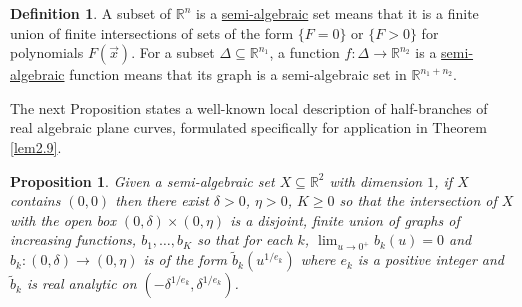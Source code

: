 \documentclass[12pt]{amsart}
\newtheorem{prop}[thm]{Proposition}
\theoremstyle{definition}
\newtheorem{defn}[thm]{Definition}
\theoremstyle{remark}
\numberwithin{equation}{section}
\newcommand{\re}{\mathbb{R}}
\begin{document}
\begin{defn}\label{def4.2}
  A subset of $\re^{n}$ is a {\underline{semi-algebraic}} set means that it is a finite union of finite intersections of sets of the form $\{F=0\}$ or $\{F>0\}$ for polynomials $F(\vec x)$.  For a subset $\Delta\subseteq\re^{n_1}$, a function $f:\Delta\to\re^{n_2}$ is a {\underline{semi-algebraic}} function means that its graph is a semi-algebraic set in $\re^{n_1+n_2}$.
\end{defn}

The next Proposition states a well-known local description of half-branches of real algebraic plane curves, formulated specifically for application in Theorem \ref{lem2.9}.


\begin{prop}\label{lem2.11}
  Given a semi-algebraic set $X\subseteq\re^2$ with dimension $1$, if $X$ contains $(0,0)$ then there exist $\delta>0$, $\eta>0$, $K\ge0$ so that the intersection of $X$ with the open box $(0,\delta)\times(0,\eta)$ is a disjoint, finite union of graphs of increasing functions, $b_1,\ldots,b_K$ so that for each $k$, ${\displaystyle{\lim_{u\to0^+}b_k(u)=0}}$ and $b_k:(0,\delta)\to(0,\eta)$ is of the form $\tilde b_k(u^{1/e_k})$ where $e_k$ is a positive integer and $\tilde b_k$ is real analytic on $(-\delta^{1/e_k},\delta^{1/e_k})$.  
\end{prop}
\end{document}
